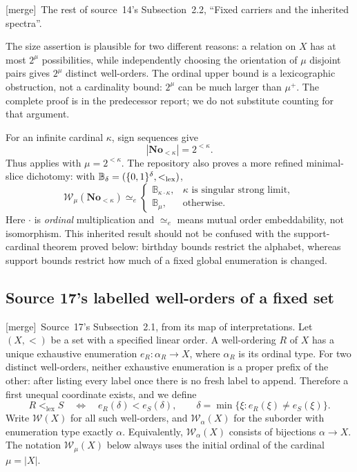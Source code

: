\documentclass[11pt]{article}
\theoremstyle{definition}
\theoremstyle{remark}
\newcommand{\No}{\mathbf{No}}
\newcommand{\WO}{\mathcal W}
\newcommand{\W}{\mathcal W}
\newcommand{\lex}{\mathrm{lex}}
\newcommand{\equim}{\mathrel{\simeq_{\!e}}}
\newcommand{\merge}{\textsf{[merge]}}
\begin{document}

\merge\ The rest of source~14's Subsection~2.2, ``Fixed carriers and the
inherited spectra''.

The size assertion is plausible for two different reasons: a relation on
$X$ has at most $2^\mu$ possibilities, while independently choosing the
orientation of $\mu$ disjoint pairs gives $2^\mu$ distinct well-orders.
The ordinal upper bound is a lexicographic obstruction, not a cardinality
bound: $2^\mu$ can be much larger than $\mu^+$. The complete proof is in
the predecessor report; we do not substitute counting for that argument.

For an infinite cardinal $\kappa$, sign sequences give
\[
 |\No_{<\kappa}|=2^{<\kappa}.
\]
Thus  applies with $\mu=2^{<\kappa}$.
The repository also proves a more refined minimal-slice dichotomy:
with $\mathbb B_\delta=(\{0,1\}^{\delta},<_{\rm lex})$,
\[
 \W_\mu(\No_{<\kappa})\equim
 \begin{cases}
   \mathbb B_{\kappa\cdot\kappa},&\kappa\text{ is singular strong limit},\\
   \mathbb B_\mu,&\text{otherwise}.
 \end{cases}
\]
Here $\cdot$ is \emph{ordinal} multiplication and $\equim$ means mutual
order embeddability, not isomorphism. This inherited result should not be
confused with the support-cardinal theorem proved below: birthday bounds
restrict the alphabet, whereas support bounds restrict how much of a
fixed global enumeration is changed.

\subsection{Source 17's labelled well-orders of a fixed set}\label{swo:vi:sub:gs-base}

\merge\ Source~17's Subsection~2.1, from its map of interpretations.
Let $(X,<)$ be a set with a specified linear order. A well-ordering $R$ of
$X$ has a unique exhaustive enumeration
$e_R:\alpha_R\longrightarrow X$, where $\alpha_R$ is its ordinal type.
For two distinct well-orders, neither exhaustive enumeration is a proper
prefix of the other: after listing every label once there is no fresh label
to append. Therefore a first unequal coordinate exists, and we define
\[
 R<_{\lex}S\quad\Longleftrightarrow\quad
 e_R(\delta)<e_S(\delta),\qquad
 \delta=\min\{\xi:e_R(\xi)\ne e_S(\xi)\}.
\]
Write $\WO(X)$ for all such well-orders, and $\WO_\alpha(X)$ for the
suborder with enumeration type exactly $\alpha$. Equivalently,
$\WO_\alpha(X)$ consists of bijections $\alpha\to X$.
The notation $\WO_\mu(X)$ below always uses the initial ordinal of the
cardinal $\mu=|X|$.
\end{document}
